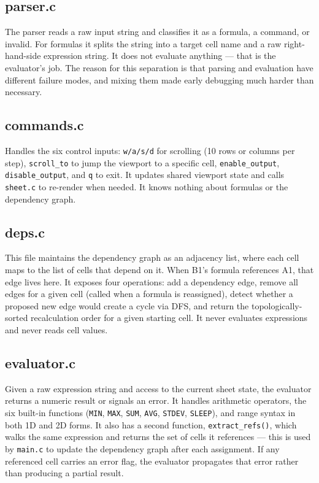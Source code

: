 \documentclass[11pt,a4paper]{article}
\begin{document}
\subsection{parser.c}

The parser reads a raw input string and classifies it as a formula, a command, or invalid. For formulas it splits the string into a target cell name and a raw right-hand-side expression string. It does not evaluate anything --- that is the evaluator's job. The reason for this separation is that parsing and evaluation have different failure modes, and mixing them made early debugging much harder than necessary.

\subsection{commands.c}

Handles the six control inputs: \texttt{w/a/s/d} for scrolling (10 rows or columns per step), \texttt{scroll\_to} to jump the viewport to a specific cell, \texttt{enable\_output}, \texttt{disable\_output}, and \texttt{q} to exit. It updates shared viewport state and calls \texttt{sheet.c} to re-render when needed. It knows nothing about formulas or the dependency graph.

\subsection{deps.c}

This file maintains the dependency graph as an adjacency list, where each cell maps to the list of cells that depend on it. When B1's formula references A1, that edge lives here. It exposes four operations: add a dependency edge, remove all edges for a given cell (called when a formula is reassigned), detect whether a proposed new edge would create a cycle via DFS, and return the topologically-sorted recalculation order for a given starting cell. It never evaluates expressions and never reads cell values.

\subsection{evaluator.c}

Given a raw expression string and access to the current sheet state, the evaluator returns a numeric result or signals an error. It handles arithmetic operators, the six built-in functions (\texttt{MIN}, \texttt{MAX}, \texttt{SUM}, \texttt{AVG}, \texttt{STDEV}, \texttt{SLEEP}), and range syntax in both 1D and 2D forms. It also has a second function, \texttt{extract\_refs()}, which walks the same expression and returns the set of cells it references --- this is used by \texttt{main.c} to update the dependency graph after each assignment. If any referenced cell carries an error flag, the evaluator propagates that error rather than producing a partial result.
\end{document}
